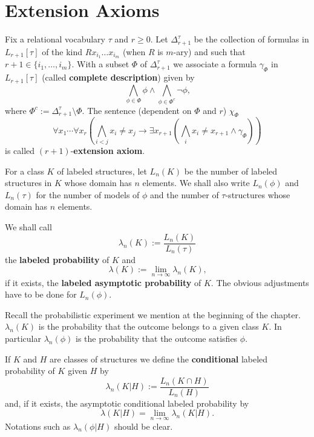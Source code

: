 \section{Extension Axioms}
Fix a relational vocabulary $\tau$ and $r\ge 0$. Let $\Delta_{r+1} ^{\tau}$ be the collection of formulas in $L_{r+1}[\tau]$ of the kind $Rx_{i_1} \ldots x_{i_m}$ (when $R$ is $m$-ary) and such that $r+1 \in \{i_1, \ldots, i_m\}$.
With a subset $\Phi$ of $\Delta_{r+1} ^{\tau}$ we associate a formula $\gamma_{\Phi}$ in $L_{r+1}[\tau]$ (called \textbf{complete description}) given by 
$$\bigwedge_{\phi \in \Phi} \phi \land \bigwedge_{\phi \in \Phi^c} \lnot \phi \text{,}$$
where $\Phi^c := \Delta_{r+1} ^{\tau} \setminus \Phi$. 
The sentence (dependent on $\Phi$ and $r$) $\chi_{\Phi}$ 
$$\forall x_1 \cdots \forall x_r \left ( \bigwedge_{i < j} x_i \neq x_j \rightarrow \exists x_{r+1} \left ( \bigwedge_{i} x_i \neq x_{r+1} \land \gamma_{\Phi} \right ) \right )$$ 
is called $(r+1)$-\textbf{extension axiom}. 

For a class $K$ of labeled structures, let $L_n(K)$ be the number of labeled structures in $K$ whose domain has $n$ elements. 
We shall also write $L_n(\phi)$ and $L_n(\tau)$ for the number of models of $\phi$ and the number of $\tau$-structures whose domain has $n$ elements. 

\begin{defn} 
\label{def_prob}
We shall call 
$$\lambda_n(K):=\frac{L_n(K)}{L_n(\tau)} $$ the \textbf{labeled probability} of $K$ and $$\lambda(K):=\lim_{n \to \infty} \lambda_n(K)\text{,}$$ if it exists, the \textbf{labeled asymptotic probability} of $K$. 
The obvious adjustments have to be done for $L_n(\phi)$. 
\end{defn}

Recall the probabilistic experiment we mention at the beginning of the chapter.
$\lambda_n(K)$ is the probability that the outcome belongs to a given class $K$. 
In particular $\lambda_n(\phi)$ is the probability that the outcome satisfies $\phi$. 

\begin{defn} 
\label{def_cond}
If $K$ and $H$ are classes of structures we define the \textbf{conditional} labeled probability of $K$ given $H$ by 
$$\lambda_n(K|H):=\frac{L_n(K \cap H)}{L_n(H)}$$
and, if it exists, the asymptotic conditional labeled probability by 
$$\lambda(K|H)=\lim_{n \to \infty} \lambda_n(K|H) \text{.}$$
Notations such as $\lambda_n(\phi|H)$ should be clear. 
\end{defn}

